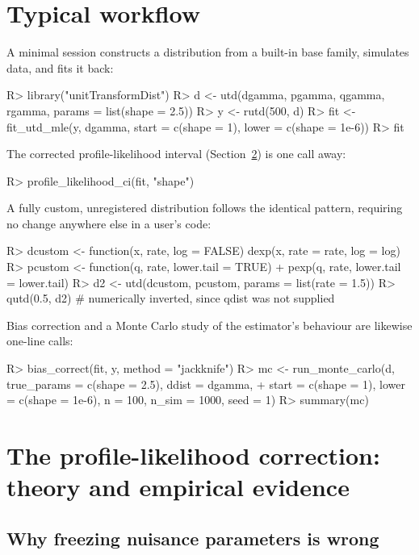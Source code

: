 \documentclass[article]{jss}
\begin{document}
\section{Typical workflow}
\label{sec:workflow}

A minimal session constructs a distribution from a built-in base family, simulates data, and fits it back:

\begin{CodeInput}
R> library("unitTransformDist")
R> d <- utd(dgamma, pgamma, qgamma, rgamma, params = list(shape = 2.5))
R> y <- rutd(500, d)
R> fit <- fit_utd_mle(y, dgamma, start = c(shape = 1), lower = c(shape = 1e-6))
R> fit
\end{CodeInput}

The corrected profile-likelihood interval (Section~\ref{sec:contribution}) is one call away:

\begin{CodeInput}
R> profile_likelihood_ci(fit, "shape")
\end{CodeInput}

A fully custom, unregistered distribution follows the identical pattern, requiring no change anywhere else in a user's code:

\begin{CodeInput}
R> dcustom <- function(x, rate, log = FALSE) dexp(x, rate = rate, log = log)
R> pcustom <- function(q, rate, lower.tail = TRUE)
+    pexp(q, rate, lower.tail = lower.tail)
R> d2 <- utd(dcustom, pcustom, params = list(rate = 1.5))
R> qutd(0.5, d2)  # numerically inverted, since qdist was not supplied
\end{CodeInput}

Bias correction and a Monte Carlo study of the estimator's behaviour are likewise one-line calls:

\begin{CodeInput}
R> bias_correct(fit, y, method = "jackknife")
R> mc <- run_monte_carlo(d, true_params = c(shape = 2.5), ddist = dgamma,
+    start = c(shape = 1), lower = c(shape = 1e-6), n = 100, n_sim = 1000, seed = 1)
R> summary(mc)
\end{CodeInput}

\section{The profile-likelihood correction: theory and empirical evidence}
\label{sec:contribution}

\subsection{Why freezing nuisance parameters is wrong}
\label{sec:naive-wrong}
\end{document}

